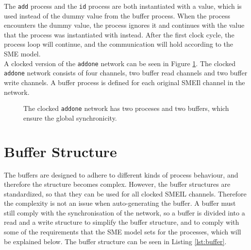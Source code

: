 The \texttt{add} process and the \texttt{id} process are both instantiated with a value, which is used instead of the dummy value from the buffer process. When the process encounters the dummy value, the process ignores it and continues with the value that the process was instantiated with instead. After the first clock cycle, the process loop will continue, and the communication will hold according to the SME model.\\

A clocked version of the \texttt{addone} network can be seen in Figure \ref{fig:addone_clocked}. The clocked \texttt{addone} network consists of four channels, two buffer read channels and two buffer write channels. A buffer process is defined for each original SMEIl channel in the network. \\

\begin{figure}
\centering
{}
\caption{The clocked \texttt{addone} network has two proceses and two buffers, which ensure the global synchronicity.}
\label{fig:addone_clocked}
\end{figure}
\section{Buffer Structure}
The buffers are designed to adhere to different kinds of process behaviour, and therefore the structure becomes complex. However, the buffer structures are standardized, so that they can be used for all clocked SMEIL channels. Therefore the complexity is not an issue when auto-generating the buffer. A buffer must still comply with the synchronisation of the network, so a buffer is divided into a read and a write structure to simplify the buffer structure, and to comply with some of the requirements that the SME model sets for the processes, which will be explained below.
The buffer structure can be seen in Listing \ref{lst:buffer}.\\


